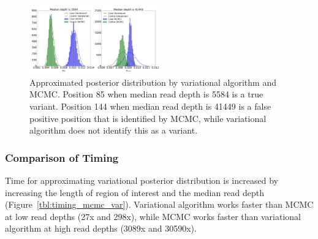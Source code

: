\documentclass{article}
\begin{document}
\begin{figure}[h]
\centering
\vspace{-10pt}
\includegraphics[width=0.5\textwidth]{figs/combine_posterior.pdf}
\caption{Approximated posterior distribution by variational algorithm and MCMC. Position 85 when median read depth is 5584 is a true variant. Position 144 when median read depth is 41449 is a false positive position that is identified by MCMC, while variational algorithm does not identify this as a variant.}
\vspace{-5pt}
\label{tbl:combine_posterior}
\end{figure}



\subsubsection*{Comparison of Timing}
Time for approximating variational posterior distribution is increased by increasing the length of region of interest and the median read depth (Figure~\ref{tbl:timing_mcmc_var}).
Variational algorithm works faster than MCMC at low read depths (27x and 298x), while MCMC works faster than variational algorithm at high read depths (3089x and 30590x).
\end{document}
